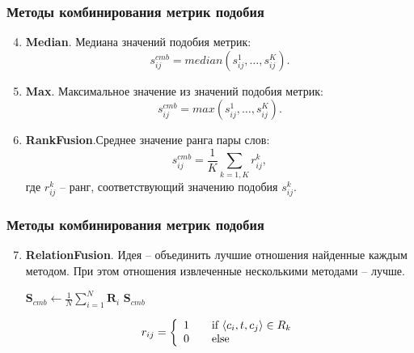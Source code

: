 \documentclass{beamer}
\begin{document}
\begin{frame}
\frametitle{Методы комбинирования метрик подобия}

\begin{enumerate}
  \setcounter{enumi}{3}
\item \textbf{Median}. Медиана значений подобия метрик:
$$s_{ij}^{cmb}= median(s_{ij}^1,\ldots,s_{ij}^K). $$

\item \textbf{Max}. Максимальное значение из значений подобия метрик:
$$s_{ij}^{cmb}= max(s_{ij}^1,\ldots,s_{ij}^K).$$

\item \textbf{RankFusion}.Среднее значение ранга пары слов:
 $$s_{ij}^{cmb}= \frac{1}{K}\sum_{k=1,K}
r_{ij}^k,$$
где $r^k_{ij}$ -- ранг, соответствующий значению подобия $s^k_{ij}$.
\end{enumerate}

\end{frame}



\begin{frame}
\frametitle{Методы комбинирования метрик подобия}

\begin{enumerate}
  \setcounter{enumi}{6}
  \item \textbf{RelationFusion}. Идея -- объединить лучшие отношения найденные каждым методом. При этом   отношения извлеченные несколькими методами -- лучше. 

\begin{algorithm}[H]
\SetLine
{}

$\mathbf{S}_{cmb} \leftarrow \frac{1}{N} \sum_{i=1}^N \mathbf{R}_i$ \;
\Return $\mathbf{S}_{cmb}$ \;
\label{rfusion}
\end{algorithm}
$$
r_{ij} = \left\{ 
  \begin{array}{l l}
    1 & \quad \text{if } \langle c_i, t, c_j \rangle \in R_k \\
    0 & \quad \text{else}\\
  \end{array} \right.
$$

\end{enumerate}

\end{frame}
\end{document}
